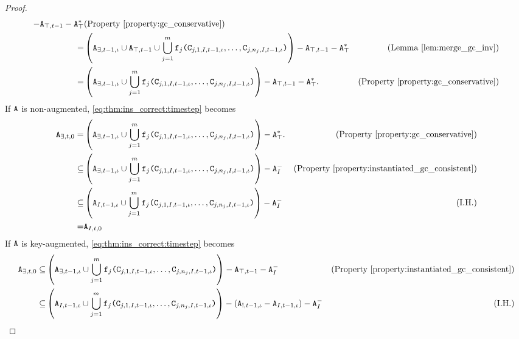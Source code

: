 \documentclass{article}
\numberwithin{equation}{section}
\renewcommand{\tt}[1]{\ifmmode\text{\texttt{#1}}\else\texttt{#1}\fi}
\begin{document}
\begin{proof}
\begin{align}
- \tt{A}_{\top,t-1} - \tt{A}_\top^* & \text{(Property \ref{property:gc_conservative})}\nonumber\\
=& \left(\tt{A}_{\exists,t-1,\iota} \cup \tt{A}_{\top,t-1} \cup \bigcup_{j=1}^m \tt{f}_j\tt{(}\tt{C}_{j,1,I,t-1,\iota}, \dots, \tt{C}_{j,n_j,I,t-1,\iota}\tt{)}\right)
- \tt{A}_{\top,t-1} - \tt{A}_\top^* & \text{(Lemma \ref{lem:merge_gc_inv})}\nonumber\\
=& \left(\tt{A}_{\exists,t-1,\iota} \cup \bigcup_{j=1}^m \tt{f}_j\tt{(}\tt{C}_{j,1,I,t-1,\iota}, \dots, \tt{C}_{j,n_j,I,t-1,\iota}\tt{)}\right)
- \tt{A}_{\top,t-1} - \tt{A}_\top^*. & \text{(Property \ref{property:gc_conservative})} \label{eq:thm:ins_correct:timestep}
\end{align}
If $\tt{A}$ is non-augmented, \eqref{eq:thm:ins_correct:timestep} becomes
\begin{align}
\tt{A}_{\exists,t,0}
=& \left(\tt{A}_{\exists,t-1,\iota} \cup \bigcup_{j=1}^m \tt{f}_j\tt{(}\tt{C}_{j,1,I,t-1,\iota}, \dots, \tt{C}_{j,n_j,I,t-1,\iota}\tt{)}\right)
- \tt{A}_\top^*. & \text{(Property \ref{property:gc_conservative})}\nonumber\\
\subseteq& \left(\tt{A}_{\exists,t-1,\iota} \cup \bigcup_{j=1}^m \tt{f}_j\tt{(}\tt{C}_{j,1,I,t-1,\iota}, \dots, \tt{C}_{j,n_j,I,t-1,\iota}\tt{)}\right)
- \tt{A}_I^- & \text{(Property \ref{property:instantiated_gc_consistent})} \nonumber\\%
\subseteq& \left(\tt{A}_{I,t-1,\iota} \cup \bigcup_{j=1}^m \tt{f}_j\tt{(}\tt{C}_{j,1,I,t-1,\iota}, \dots, \tt{C}_{j,n_j,I,t-1,\iota}\tt{)}\right)
- \tt{A}_I^- & \text{(I.H.)} \nonumber\\%
=& \tt{A}_{I,t,0} \nonumber
\end{align}
If $\tt{A}$ is key-augmented, \eqref{eq:thm:ins_correct:timestep} becomes
\begin{align*}
\tt{A}_{\exists,t,0}
\subseteq& \left(\tt{A}_{\exists,t-1,\iota} \cup \bigcup_{j=1}^m \tt{f}_j\tt{(}\tt{C}_{j,1,I,t-1,\iota}, \dots, \tt{C}_{j,n_j,I,t-1,\iota}\tt{)}\right)
- \tt{A}_{\top,t-1} - \tt{A}_I^- & \text{(Property \ref{property:instantiated_gc_consistent})} 
\\
\subseteq& \left(\tt{A}_{I,t-1,\iota} \cup \bigcup_{j=1}^m \tt{f}_j\tt{(}\tt{C}_{j,1,I,t-1,\iota}, \dots, \tt{C}_{j,n_j,I,t-1,\iota}\tt{)}\right)
-(\tt{A}_{!,t-1,\iota} - \tt{A}_{I,t-1,\iota}) - \tt{A}_I^- & \text{(I.H.)}\\

\end{align*}
\end{proof}
\end{document}
